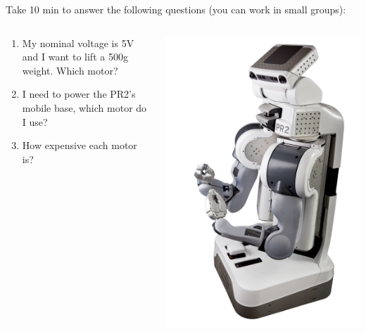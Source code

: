 \documentclass[compress]{beamer}
\begin{document}
\begin{frame}[plain]{}
    Take 10 min to answer the following questions (you can work in small
    groups):

    \begin{columns}
        \begin{column}{0.5\linewidth}
            \begin{enumerate}
                \item My nominal voltage is 5V and I want to lift a 500g weight.
                    Which motor?
                \item I need to power the PR2's mobile base, which motor do I use?
                \item How expensive each motor is?
            \end{enumerate}
        \end{column}
        \begin{column}{0.5\linewidth}
            \begin{center}
                \includegraphics[width=0.8\linewidth]{pr2}
            \end{center}
        \end{column}
    \end{columns}
\end{frame}
\end{document}
